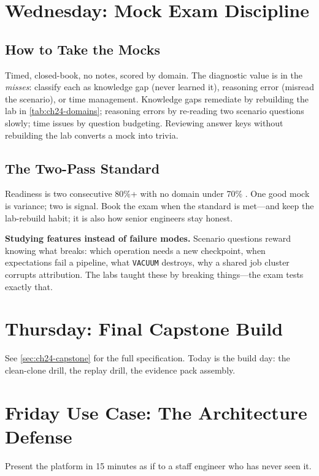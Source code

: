 \section{Wednesday: Mock Exam Discipline}
\subsection{How to Take the Mocks}
Timed, closed-book, no notes, scored by domain. The diagnostic value is in the \emph{misses}: classify each as knowledge gap (never learned it), reasoning error (misread the scenario), or time management. Knowledge gaps remediate by rebuilding the lab in \cref{tab:ch24-domains}; reasoning errors by re-reading two scenario questions slowly; time issues by question budgeting. Reviewing answer keys without rebuilding the lab converts a mock into trivia.

\subsection{The Two-Pass Standard}
Readiness is two consecutive 80\%+ with no domain under 70\% \cite{databricksCertification}. One good mock is variance; two is signal. Book the exam when the standard is met---and keep the lab-rebuild habit; it is also how senior engineers stay honest.

\begin{pitfall}
\textbf{Studying features instead of failure modes.} Scenario questions reward knowing what breaks: which operation needs a new checkpoint, when expectations fail a pipeline, what \texttt{VACUUM} destroys, why a shared job cluster corrupts attribution. The labs taught these by breaking things---the exam tests exactly that.
\end{pitfall}

\section{Thursday: Final Capstone Build}
See \cref{sec:ch24-capstone} for the full specification. Today is the build day: the clean-clone drill, the replay drill, the evidence pack assembly.

\section{Friday Use Case: The Architecture Defense}
Present the platform in 15 minutes as if to a staff engineer who has never seen it.

